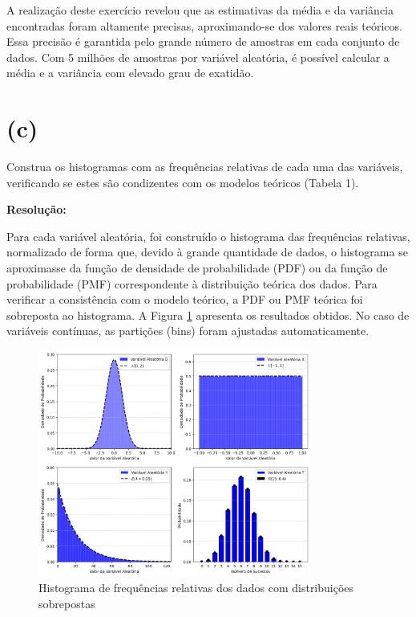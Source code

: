 \documentclass[]{abntex2}
\begin{document}
A realização deste exercício revelou que as estimativas da média e da variância encontradas foram altamente precisas, aproximando-se dos valores reais teóricos. Essa precisão é garantida pelo grande número de amostras em cada conjunto de dados. Com 5 milhões de amostras por variável aleatória, é possível calcular a média e a variância com elevado grau de exatidão.

\section*{\textbf{(c)}}

\noindent Construa os histogramas com as frequências relativas de cada uma das variáveis,
verificando se estes são condizentes com os modelos teóricos (Tabela 1).

\textbf{Resolução:}

Para cada variável aleatória, foi construído o histograma das frequências relativas, normalizado de forma que, devido à grande quantidade de dados, o histograma se aproximasse da função de densidade de probabilidade (PDF) ou da função de probabilidade (PMF) correspondente à distribuição teórica dos dados. Para verificar a consistência com o modelo teórico, a PDF ou PMF teórica foi sobreposta ao histograma. A Figura \ref{fig:hist} apresenta os resultados obtidos. No caso de variáveis contínuas, as partições (bins) foram ajustadas automaticamente.

\begin{figure}[H]
    \centering 
    \includegraphics[width=0.8\textwidth]{imgs/hist.png}
    \caption{Histograma de frequências relativas dos dados com distribuições sobrepostas}
    \label{fig:hist} %
\end{figure}
\end{document}
